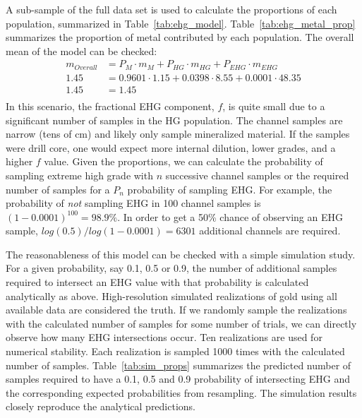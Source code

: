 A sub-sample of the full data set is used to calculate the proportions of each population, summarized in Table~\ref{tab:ehg_model}. Table~\ref{tab:ehg_metal_prop} summarizes the proportion of metal contributed by each population. The overall mean of the model can be checked:
\begin{align*}
    m_{Overall} & = P_{M} \cdot m_{M}  + P_{HG} \cdot m_{HG} + P_{EHG} \cdot m_{EHG} \\
    1.45        & = 0.9601 \cdot 1.15 + 0.0398 \cdot 8.55 + 0.0001 \cdot 48.35       \\
    1.45        & = 1.45                                                             \\
\end{align*}
In this scenario, the fractional \gls{EHG} component, $f$, is quite small due to a significant number of samples in the HG population. The channel samples are narrow (tens of cm) and likely only sample mineralized material. If the samples were drill core, one would expect more internal dilution, lower grades, and a higher $f$ value. Given the proportions, we can calculate the probability of sampling extreme high grade with $n$ successive channel samples or the required number of samples for a $P_n$ probability of sampling \gls{EHG}. For example, the probability of \emph{not} sampling \gls{EHG} in 100 channel samples is $(1-0.0001)^{100} = 98.9\%$. In order to get a 50\% chance of observing an \gls{EHG} sample, $log(0.5)/log(1-0.0001) = 6301$ additional channels are required.




The reasonableness of this model can be checked with a simple simulation study. For a given probability, say 0.1, 0.5 or 0.9, the number of additional samples required to intersect an \gls{EHG} value with that probability is calculated analytically as above. High-resolution simulated realizations of gold using all available data are considered the truth. If we randomly sample the realizations with the calculated number of samples for some number of trials, we can directly observe how many \gls{EHG} intersections occur. Ten realizations are used for numerical stability. Each realization is sampled 1000 times with the calculated number of samples. Table~\ref{tab:sim_props} summarizes the predicted number of samples required to have a 0.1, 0.5 and 0.9 probability of intersecting \gls{EHG} and the corresponding expected probabilities from resampling. The simulation results closely reproduce the analytical predictions.

